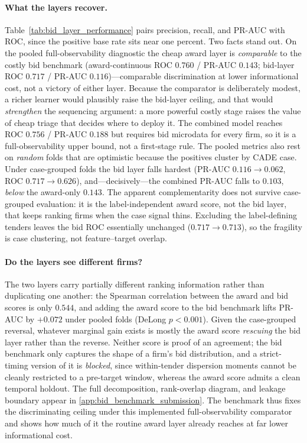 \paragraph{What the layers recover.}
Table~\ref{tab:bid_layer_performance} pairs precision, recall, and
PR-AUC with ROC, since the positive base rate sits near one percent.
Two facts stand out. On the pooled full-observability diagnostic the
cheap award layer is \emph{comparable} to the costly bid benchmark
(award-continuous ROC $0.760$ / PR-AUC $0.143$; bid-layer
\valBidLearner{} ROC $0.717$ / PR-AUC $0.116$)---comparable
discrimination at lower informational cost, not a victory of either
layer. Because the comparator is deliberately modest, a richer learner
would plausibly raise the bid-layer ceiling, and that would
\emph{strengthen} the sequencing argument: a more powerful costly stage
raises the value of cheap triage that decides where to deploy it. The
combined model reaches ROC $0.756$ / PR-AUC $0.188$ but requires bid
microdata for every firm, so it is a full-observability upper bound,
not a first-stage rule. The pooled metrics also rest on \emph{random}
folds that are optimistic because the positives cluster by CADE case.
Under case-grouped folds the bid layer falls hardest (PR-AUC
$0.116\!\to\!0.062$, ROC $0.717\!\to\!0.626$), and---decisively---the
combined PR-AUC falls to $0.103$, \emph{below} the award-only $0.143$.
The apparent complementarity does not survive case-grouped evaluation:
it is the label-independent award score, not the bid layer, that keeps
ranking firms when the case signal thins. Excluding the label-defining
tenders leaves the bid ROC essentially unchanged ($0.717\!\to\!0.713$),
so the fragility is case clustering, not feature--target overlap.

\paragraph{Do the layers see different firms?}
The two layers carry partially different ranking information rather
than duplicating one another: the Spearman correlation between the
award and bid scores is only $0.544$, and adding the award score to
the bid benchmark lifts PR-AUC by $+0.072$ under pooled folds (DeLong
$p<0.001$). Given the case-grouped reversal, whatever marginal gain
exists is mostly the award score \emph{rescuing} the bid layer rather
than the reverse. Neither score is proof of an agreement; the bid
benchmark only captures the shape of a firm's bid distribution, and a
strict-timing version of it is \emph{blocked}, since within-tender
dispersion moments cannot be cleanly restricted to a pre-target window,
whereas the award score admits a clean temporal holdout. The full
decomposition, rank-overlap diagram, and leakage boundary appear in
\ref{app:bid_benchmark_submission}. The benchmark thus fixes the
discriminating ceiling under this implemented full-observability
comparator and shows how much of it the routine award layer already
reaches at far lower informational cost.

